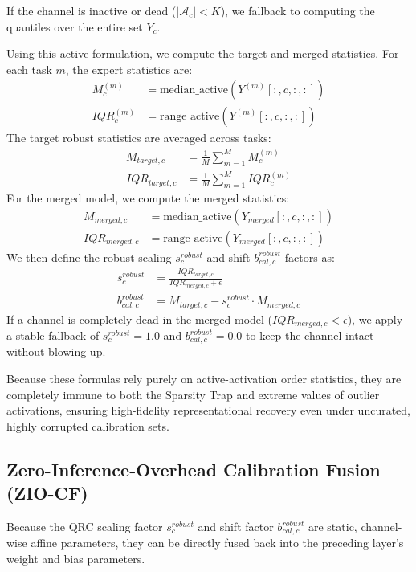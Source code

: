 \documentclass{article}
\theoremstyle{plain}
\theoremstyle{definition}
\theoremstyle{remark}
\begin{document}
If the channel is inactive or dead ($|\mathcal{A}_{c}| < K$), we fallback to computing the quantiles over the entire set $Y_{c}$. 

Using this active formulation, we compute the target and merged statistics. For each task $m$, the expert statistics are:
\begin{align}
  M^{(m)}_c &= \text{median\_active}(Y^{(m)}[:, c, :, :]) \\
  IQR^{(m)}_c &= \text{range\_active}(Y^{(m)}[:, c, :, :])
\end{align}
The target robust statistics are averaged across tasks:
\begin{align}
  M_{target, c} &= \frac{1}{M} \sum_{m=1}^M M^{(m)}_c \\
  IQR_{target, c} &= \frac{1}{M} \sum_{m=1}^M IQR^{(m)}_c
\end{align}
For the merged model, we compute the merged statistics:
\begin{align}
  M_{merged, c} &= \text{median\_active}(Y_{merged}[:, c, :, :]) \\
  IQR_{merged, c} &= \text{range\_active}(Y_{merged}[:, c, :, :])
\end{align}
We then define the robust scaling $s^{robust}_c$ and shift $b^{robust}_{cal, c}$ factors as:
\begin{align}
  s^{robust}_c &= \frac{IQR_{target, c}}{IQR_{merged, c} + \epsilon} \\
  b^{robust}_{cal, c} &= M_{target, c} - s^{robust}_c \cdot M_{merged, c}
\end{align}
If a channel is completely dead in the merged model ($IQR_{merged, c} < \epsilon$), we apply a stable fallback of $s^{robust}_c = 1.0$ and $b^{robust}_{cal, c} = 0.0$ to keep the channel intact without blowing up.

Because these formulas rely purely on active-activation order statistics, they are completely immune to both the Sparsity Trap and extreme values of outlier activations, ensuring high-fidelity representational recovery even under uncurated, highly corrupted calibration sets.

\subsection{Zero-Inference-Overhead Calibration Fusion (ZIO-CF)}
Because the QRC scaling factor $s^{robust}_c$ and shift factor $b^{robust}_{cal, c}$ are static, channel-wise affine parameters, they can be directly fused back into the preceding layer's weight and bias parameters.
\end{document}
